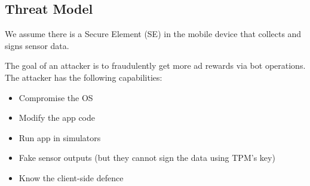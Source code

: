 \subsection{Threat Model}
We assume there is a Secure Element (SE) in the mobile device that collects and signs sensor data.

The goal of an attacker is to fraudulently get more ad rewards via bot operations. The attacker has the following capabilities:

\begin{itemize}
    \item Compromise the OS
    \item Modify the app code
    \item Run app in simulators
    \item Fake sensor outputs (but they cannot sign the data using TPM's key) 
    \item Know the client-side defence
\end{itemize}